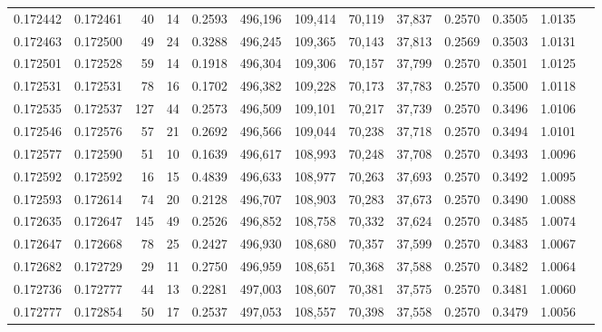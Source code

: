 \begin{tabular}{rrrrrrrrrrrrr}
0.172442 & 0.172461 &    40 &  14 &                                     0.2593 & 496,196 & 109,414 &  70,119 &  37,837 & 0.2570 & 0.3505 & 1.0135 \\
0.172463 & 0.172500 &    49 &  24 &                                     0.3288 & 496,245 & 109,365 &  70,143 &  37,813 & 0.2569 & 0.3503 & 1.0131 \\
0.172501 & 0.172528 &    59 &  14 &                                     0.1918 & 496,304 & 109,306 &  70,157 &  37,799 & 0.2570 & 0.3501 & 1.0125 \\
0.172531 & 0.172531 &    78 &  16 &                                     0.1702 & 496,382 & 109,228 &  70,173 &  37,783 & 0.2570 & 0.3500 & 1.0118 \\
0.172535 & 0.172537 &   127 &  44 &                                     0.2573 & 496,509 & 109,101 &  70,217 &  37,739 & 0.2570 & 0.3496 & 1.0106 \\
0.172546 & 0.172576 &    57 &  21 &                                     0.2692 & 496,566 & 109,044 &  70,238 &  37,718 & 0.2570 & 0.3494 & 1.0101 \\
0.172577 & 0.172590 &    51 &  10 &                                     0.1639 & 496,617 & 108,993 &  70,248 &  37,708 & 0.2570 & 0.3493 & 1.0096 \\
0.172592 & 0.172592 &    16 &  15 &                                     0.4839 & 496,633 & 108,977 &  70,263 &  37,693 & 0.2570 & 0.3492 & 1.0095 \\
0.172593 & 0.172614 &    74 &  20 &                                     0.2128 & 496,707 & 108,903 &  70,283 &  37,673 & 0.2570 & 0.3490 & 1.0088 \\
0.172635 & 0.172647 &   145 &  49 &                                     0.2526 & 496,852 & 108,758 &  70,332 &  37,624 & 0.2570 & 0.3485 & 1.0074 \\
0.172647 & 0.172668 &    78 &  25 &                                     0.2427 & 496,930 & 108,680 &  70,357 &  37,599 & 0.2570 & 0.3483 & 1.0067 \\
0.172682 & 0.172729 &    29 &  11 &                                     0.2750 & 496,959 & 108,651 &  70,368 &  37,588 & 0.2570 & 0.3482 & 1.0064 \\
0.172736 & 0.172777 &    44 &  13 &                                     0.2281 & 497,003 & 108,607 &  70,381 &  37,575 & 0.2570 & 0.3481 & 1.0060 \\
0.172777 & 0.172854 &    50 &  17 &                                     0.2537 & 497,053 & 108,557 &  70,398 &  37,558 & 0.2570 & 0.3479 & 1.0056 \\

\end{tabular}
